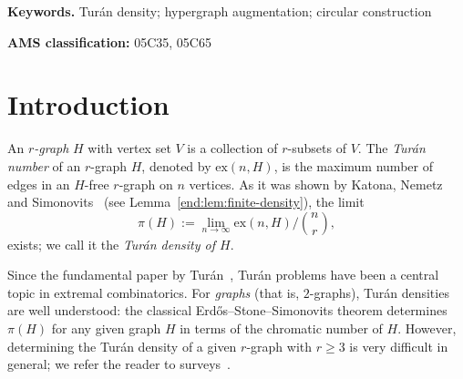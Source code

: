 \documentclass[12pt,a4paper]{article}
\numberwithin{equation}{section}
\theoremstyle{definition}
\theoremstyle{remark}
\newcommand{\hide}[1]{{\color{DarkGreen}#1}}
\renewcommand{\hide}[1]{}
\begin{document}
\begin{abstract}
{The main result in the second part deals with $r$-graph augmentations $F(r)$ of a given graph $F$ where each edge of $F$ is extended to an $r$-set by adding the same set of new $r-2$ vertices.
\hide{
The  method of Ellis--Ivan--Leader gives that, for every graph $F$ with chromatic number $\chi(F)\ge 4$, the Tur\'an densities $\pi(F(r))$ are uniformly bounded away from 0. On the other hand, Alon and, independently, Johnson proved that $\pi(F(r))\to 0$ if $\chi(F)=3$ (while it is easy to see that $\pi(F(r))$ is identically 0 if $\chi(F)=2$).}%
 We prove that, for every 3-chromatic $F$, $(\log r)^{-1-o(1)}/r\le \pi(F(r))\le 1/r$. Given the previously known results, this determines $\lim_{r\to\infty} \log \pi(F(r))/r$ for every graph~$F$.
}
\end{abstract}

\medskip
\noindent\textbf{Keywords.} Tur\'an density; hypergraph augmentation; circular construction

\medskip
\noindent\textbf{AMS classification:} 05C35, 05C65

\section{Introduction}

An \emph{$r$-graph} $H$ with vertex set $V$ is a collection of $r$-subsets of $V$. The {\em Tur\'{a}n number} of an $r$-graph $H$, denoted by $\mathrm{ex}(n,H)$, is the maximum number of edges in an $H$-free $r$-graph on $n$ vertices. 
As it was shown by Katona, Nemetz and Simonovits~\cite{KatonaNemetzSimonovits64} (see Lemma~\ref{end:lem:finite-density}), the limit
\[
\pi(H):=\lim_{n\to\infty} \mathrm{ex}(n,H)/\binom {n}{r},
\]
 exists; we call it the \emph{Tur\'an density of $H$}.

Since the fundamental paper by Tur\'an~\cite{Turan41}, Tur\'an problems have been a central topic in extremal combinatorics. For \emph{graphs} (that is, $2$-graphs), Tur\'an densities are well understood: the classical Erd\H{o}s--Stone--Simonovits theorem \cite{ErdosStone46,ErdosSimonovits66} determines $\pi(H)$ for any given graph $H$ in terms of the chromatic number of $H$. However, determining the Tur\'an density of a given $r$-graph with $r\ge 3$ is very difficult in general; we refer the reader to surveys~\cite{Furedi91,Decaen94,Sidorenko95,Keevash11}. 
\end{document}
